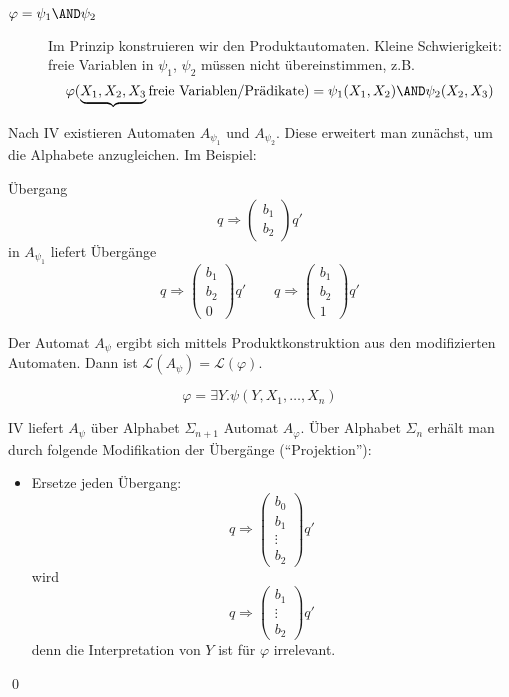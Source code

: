 \begin{description}
\begin{description}
    \item[$\varphi = \psi_1 \AND \psi_2$]
    Im Prinzip konstruieren wir den Produktautomaten. Kleine
    Schwierigkeit: freie Variablen in $\psi_1$, $\psi_2$ müssen nicht
    übereinstimmen, z.B.
    \[
      \varphi(\underbrace{X_1,X_2,X_3}{\text{freie Variablen/Prädikate}}) = \psi_1(X_1,X_2) \AND \psi_2(X_2,X_3)
    \]
  \end{description}
  
  Nach IV existieren Automaten $A_{\psi_1}$ und $A_{\psi_2}$. Diese
  erweitert man zunächst, um die Alphabete anzugleichen. Im Beispiel:
  
  Übergang
  \[
    q \Longrightarrow{\begin{pmatrix}b_1\\b_2\end{pmatrix}} q' 
  \]
  in $A_{\psi_1}$ liefert Übergänge
  \[
    q \Longrightarrow{\begin{pmatrix}b_1\\b_2\\0\end{pmatrix}} q' \qquad
    q \Longrightarrow{\begin{pmatrix}b_1\\b_2\\1\end{pmatrix}} q'
  \]
  
  Der Automat $A_\psi$ ergibt sich mittels Produktkonstruktion aus den
  modifizierten Automaten. Dann ist $\mathcal{L}(A_\psi)=\mathcal{L}(\varphi)$.
\end{description}

\[
  \varphi = \exists Y.\psi(Y, X_1, \dots, X_n)
\]

IV liefert $A_\psi$ über Alphabet $\Sigma_{n+1}$ Automat $A_\varphi$.
Über Alphabet $\Sigma_n$ erhält man durch folgende Modifikation der
Übergänge (\enquote{Projektion}):

\begin{itemize}
  \item Ersetze jeden Übergang:
  \[
    q \Longrightarrow{\begin{pmatrix}b_0\\b_1\\\vdots\\b_2\end{pmatrix}} q' 
  \]
  wird
  \[
    q \Longrightarrow{\begin{pmatrix}b_1\\\vdots\\b_2\end{pmatrix}} q' 
  \]
  denn die Interpretation von $Y$ ist für $\varphi$ irrelevant.
\end{itemize}
\qed
